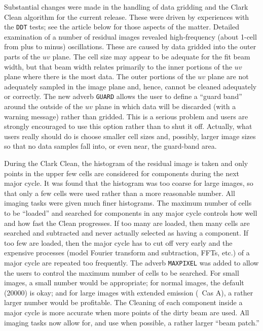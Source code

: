 Substantial changes were made in the handling of data gridding and the
Clark Clean algorithm for the current release.  These were driven by
experiences with the {\tt DDT} tests; see the article below for those
aspects of the matter.  Detailed examination of a number of residual
images revealed high-frequency (about 1-cell from plus to minus)
oscillations.  These are caused by data gridded into the outer parts
of the $uv$ plane.  The cell size may appear to be adequate for the
fit beam width, but that beam width relates primarily to the inner
portions of the $uv$ plane where there is the most data.  The outer
portions of the $uv$ plane are not adequately sampled in the image
plane and, hence, cannot be cleaned adequately or correctly.  The new
adverb {\tt GUARD} allows the user to define a ``guard band'' around
the outside of the $uv$ plane in which data will be discarded (with a
warning message) rather than gridded.  This is a serious problem and
users are strongly encouraged to use this option rather than to shut
it off.  Actually, what users really should do is choose smaller cell
sizes and, possibly, larger image sizes so that no data samples fall
into, or even near, the guard-band area.

During the Clark Clean, the histogram of the residual image is taken
and only points in the upper few cells are considered for components
during the next major cycle.  It was found that the histogram was too
coarse for large images, so that only a few cells were used rather
than a more reasonable number.  All imaging tasks were given much
finer histograms.  The maximum number of cells to be ``loaded'' and
searched for components in any major cycle controls how well and how
fast the Clean progresses.  If too many are loaded, then many cells
are searched and subtracted and never actually selected as having a
component.  If too few are loaded, then the major cycle has to cut off
very early and the expensive processes (model Fourier transform and
subtraction, FFTs, etc.) of a major cycle are repeated too frequently.
The adverb {\tt MAXPIXEL} was added to allow the users to control the
maximum number of cells to be searched.  For small images, a small
number would be appropriate; for normal images, the default (20000) is
okay; and for large images with extended emission (\eg\ Cas A), a
rather larger number would be profitable.  The Cleaning of each
component inside a major cycle is more accurate when more points of
the dirty beam are used.  All imaging tasks now allow for, and use
when possible, a rather larger ``beam patch.''

